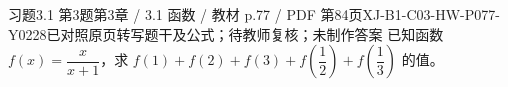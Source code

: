 \par\noindent\begin{minipage}{\linewidth}
\begin{bankitem}{习题3.1 第3题}{第3章 / 3.1 函数 / 教材 p.77 / PDF 第84页}{XJ-B1-C03-HW-P077-Y0228}{已对照原页转写题干及公式；待教师复核；未制作答案}
已知函数 $f(x)=\dfrac x{x+1}$，求 $f(1)+f(2)+f(3)+f\left(\dfrac12\right)+f\left(\dfrac13\right)$ 的值。
\end{bankitem}
\end{minipage}\par\medskip
